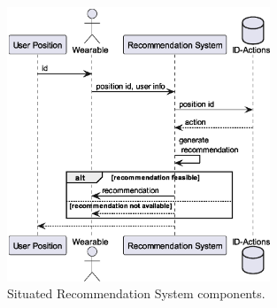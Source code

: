 \begin{figure}[H]
	\centering
	\includegraphics[width=0.7\textwidth]{img/seq_diag_situated.eps}
	\caption{Situated Recommendation System components.}
	\label{fig:situated-recommendation}
\end{figure}

